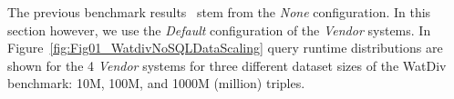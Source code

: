 %
%
The previous benchmark results~\cite{de2016big} stem from the \emph{None} configuration. In this section however, we use the \emph{Default} configuration of the \emph{Vendor} systems.
In Figure~\ref{fig:Fig01_WatdivNoSQLDataScaling} query runtime distributions are shown for the 4 \emph{Vendor} systems for three different dataset sizes of the WatDiv benchmark: 10M, 100M, and 1000M (million) triples.
%
%
%  


